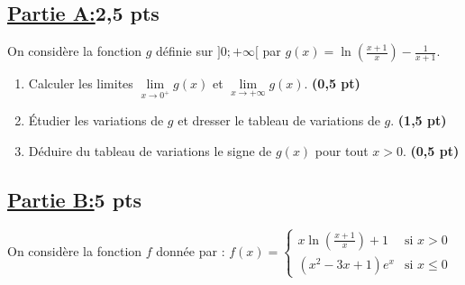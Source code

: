 \documentclass[12pt,a4paper]{article}
\begin{document}
\vspace{0.4em}
\subsection*{\underline{Partie A:}\quad\textbf{2,5 pts}}
On considère la fonction \( g \) définie sur \( ]0 ; +\infty[ \) par \( g(x) = \ln\left( \frac{x+1}{x} \right) - \frac{1}{x+1} \).

\begin{enumerate}
    \item Calculer les limites \( \lim\limits_{x \to 0^+} g(x) \) et \( \lim\limits_{x \to +\infty} g(x) \). \hfill \textbf{(0,5 pt)}
    \item Étudier les variations de \( g \) et dresser le tableau de variations de \( g \). \hfill \textbf{(1,5 pt)}
    \item Déduire du tableau de variations le signe de \( g(x) \) pour tout \( x > 0 \). \hfill \textbf{(0,5 pt)}
\end{enumerate}

\vspace{0.4em}
\subsection*{\underline{Partie B:}\quad\textbf{5 pts}}
On considère la fonction \( f \) donnée par :
\(
f(x) =
\begin{cases}
x \ln\left( \frac{x+1}{x} \right) + 1 & \text{si } x > 0 \\
(x^2 - 3x + 1)e^x & \text{si } x \leq 0
\end{cases}
\)
\end{document}

